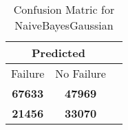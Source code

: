 \begin{table}[] 
\caption{Confusion Matric for NaiveBayesGaussian} 
\label{Table: Prediction Accuracy-DMDNaiveBayesGaussianOnlySunEKF-ignoreReflection-Reflection} 
\centering 
\begin{tabular} 
 {@{}ccc@{}} 
\toprule 
\multicolumn{2}{c}{\textbf{Predicted}}
 \\ \midrule 
\multicolumn{1}{|c|}{Failure} & 
\multicolumn{1}{c|}{No Failure}
 \\ \midrule 
\multicolumn{1}{|c|}{\color{green}\textbf{67633}} & 
\multicolumn{1}{c|}{\color{green}\textbf{47969}}
 \\ \midrule 
\multicolumn{1}{|c|}{\color{red}\textbf{21456}} & 
\multicolumn{1}{c|}{\color{red}\textbf{33070}}
 \\ \bottomrule 
\end{tabular} 
\end{table} 
